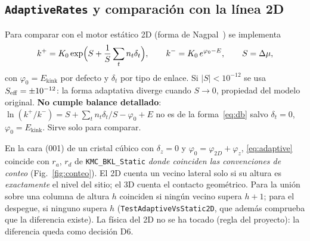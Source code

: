\documentclass[11pt,a4paper]{article}
\newcommand{\code}[1]{\texttt{#1}}
\newcommand{\Ekink}{E_{\mathrm{kink}}}
\newcommand{\dmu}{\Delta\mu}
\begin{document}
\subsection{\texorpdfstring{\code{AdaptiveRates}}{AdaptiveRates} y comparación con la línea 2D}
\label{sec:adaptive}

Para comparar con el motor estático 2D (forma de Nagpal~\cite{nagpal2024}) se implementa
\begin{equation}
k^+=K_0\exp\Bigl(S+\frac{1}{S}\sum_t n_t\delta_t\Bigr),\qquad k^-=K_0\,e^{\varphi_0-E},\qquad S=\dmu,
\label{eq:adaptive}
\end{equation}
con $\varphi_0=\Ekink$ por defecto y $\delta_t$ por tipo de enlace. Si $|S|<10^{-12}$ se usa
$S_{\rm eff}=\pm10^{-12}$: la forma adaptativa diverge cuando $S\to0$, propiedad del modelo original.
\textbf{No cumple balance detallado}: $\ln(k^+/k^-)=S+\sum_tn_t\delta_t/S-\varphi_0+E$ no es de la
forma~\eqref{eq:db} salvo $\delta_t=0$, $\varphi_0=\Ekink$. Sirve solo para comparar.

En la cara (001) de un cristal cúbico con $\delta_z=0$ y $\varphi_0=\varphi_{2D}+\varphi_z$,
\eqref{eq:adaptive} coincide con $r_a$, $r_d$ de \code{KMC\_BKL\_Static} \emph{donde coinciden las
convenciones de conteo} (Fig.~\ref{fig:conteo}). El 2D cuenta un vecino lateral solo si su altura es
\emph{exactamente} el nivel del sitio; el 3D cuenta el contacto geométrico. Para la unión sobre una
columna de altura $h$ coinciden si ningún vecino supera $h+1$; para el despegue, si ninguno supera $h$
(\code{TestAdaptiveVsStatic2D}, que además comprueba que la diferencia existe). La física del 2D no se
ha tocado (regla del proyecto): la diferencia queda como decisión D6.
\end{document}

